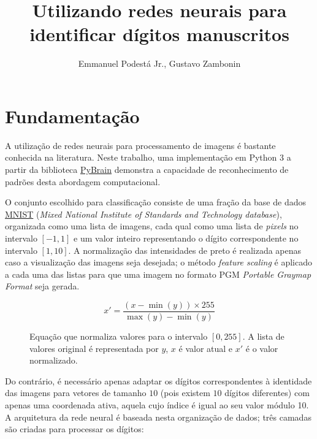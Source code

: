 \documentclass{../../sftex/sftex}
\title{Utilizando redes neurais para identificar dígitos manuscritos}
\author{Emmanuel Podestá Jr., Gustavo Zambonin}
\begin{document}
\maketitle

\section{Fundamentação}

A utilização de redes neurais para processamento de imagens é bastante conhecida
na literatura. Neste trabalho, uma implementação em Python 3 a partir da
biblioteca \href{http://pybrain.org/}{PyBrain} demonstra a capacidade de
reconhecimento de padrões desta abordagem computacional. \medskip

O conjunto escolhido para classificação consiste de uma fração da base de dados
\href{http://yann.lecun.com/exdb/mnist/}{MNIST} (\emph{Mixed National Institute
of Standards and Technology database}), organizada como uma lista de imagens,
cada qual como uma lista de \emph{pixels} no intervalo $[-1, 1]$ e um valor
inteiro representando o dígito correspondente no intervalo $[1, 10]$. A
normalização das intensidades de preto é realizada apenas caso a visualização
das imagens seja desejada; o método \emph{feature scaling} é aplicado a cada uma
das listas para que uma imagem no formato PGM \emph{{Portable Graymap Format}}
seja gerada.

\begin{figure}[htbp]
    \[ x' = \frac{(x - \min(y)) \times 255}{\max(y) - \min(y)} \] \vspace{-5mm}
    \caption{Equação que normaliza valores para o intervalo $[0, 255]$. A
    lista de valores original é representada por $y$, $x$ é valor atual
    e $x'$ é o valor normalizado.}
\end{figure}

Do contrário, é necessário apenas adaptar os dígitos correspondentes à
identidade das imagens para vetores de tamanho $10$ (pois existem $10$ dígitos
diferentes) com apenas uma coordenada ativa, aquela cujo índice é igual ao seu
valor módulo 10. A arquitetura da rede neural é baseada nesta organização de
dados; três camadas são criadas para processar os dígitos:
\end{document}
